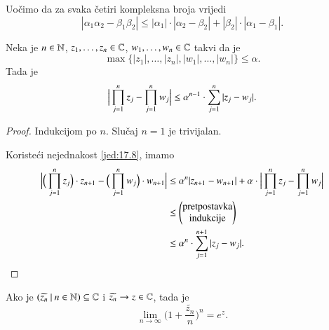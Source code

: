 Uo\v cimo da za svaka \v cetiri kompleksna broja vrijedi
\begin{equation}    \label{jed:17.8}
    |\alpha_1 \alpha_2 - \beta_1 \beta_2| \leq |\alpha_1| \cdot | \alpha_2 - \beta_2| + |\beta_2| \cdot | \alpha_1 - \beta_1|.
\end{equation}

\begin{lm}  \label{lm:17.9}
    Neka je $n \in \mathbb{N}$, $z_1, \ldots, z_n \in \mathbb{C}$, $w_1, \ldots, w_n \in \mathbb{C}$ takvi da je
    \begin{equation*}
        \max \big\{ |z_1|, \ldots, |z_n|, |w_1|, \ldots, |w_n| \big\} \leq \alpha.
    \end{equation*}
    Tada je
    \begin{equation*}
        \Big| \prod\limits_{j = 1}^{n} z_j - \prod\limits_{j = 1}^{n} w_j \Big| \leq \alpha^{n - 1} \cdot \sum\limits_{j = 1}^{n} |z_j - w_j|.
    \end{equation*}
\end{lm}

\begin{proof}
    Indukcijom po $n$.
    Slu\v caj $n = 1$ je trivijalan.
    
    Koriste\' ci nejednakost \eqref{jed:17.8}, imamo
    \begin{equation*}
        \begin{aligned}
            \Big| \Big( \prod\limits_{j = 1}^{n} z_j \Big) \cdot z_{n + 1} - \Big( \prod\limits_{j = 1}^{n} w_j \Big) \cdot w_{n + 1} \Big| &\leq \alpha^n | z_{n+1} - w_{n+1} | + \alpha \cdot \Big|  \prod\limits_{j = 1}^{n} z_j - \prod\limits_{j = 1}^{n} w_j \Big|\\
            &\leq
            \begin{pmatrix}
                \textnormal{pretpostavka}\\
                \textnormal{indukcije}
            \end{pmatrix}\\
            &\leq \alpha^n \cdot \sum\limits_{j = 1}^{n + 1} |z_j - w_j|.
        \end{aligned}
    \end{equation*}
\end{proof}

\begin{lm}  \label{lm:17.10}
    Ako je $({\widetilde{z_n}} \: | \: {n \in \mathbb{N}}) \subseteq \mathbb{C}$ i $\widetilde{z_n} \to z \in \mathbb{C}$, tada je
    \begin{equation*}
        \lim\limits_{n \to \infty} \Big( 1 + \frac{\widetilde{z_n}}{n} \Big)^n = e^z.
    \end{equation*}
\end{lm}

